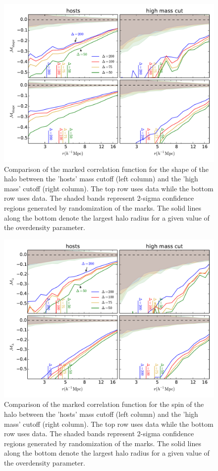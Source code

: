 \documentclass[usenatbib,usegraphicx,letterpaper]{mn2e}
\begin{document}
\begin{figure}
	\centering
	\includegraphics[width=\textwidth]{all_mcf_s_z00_hostsvhigh.pdf}
	\caption{Comparison of the marked correlation function for the shape of the halo between the 'hosts' mass cutoff (left column) and the 'high mass' cutoff (right column). The top row uses \simA data while the bottom row uses \simB data. The shaded bands represent 2-sigma confidence regions generated by randomization of the marks. The solid lines along the bottom denote the largest halo radius for a given value of the overdensity parameter.}
	\label{fig:hvh_mcf_s}
\end{figure}

\begin{figure}
	\centering
	\includegraphics[width=\textwidth]{all_mcf_spin_z00_hostsvhigh.pdf}
	\caption{Comparison of the marked correlation function for the spin of the halo between the 'hosts' mass cutoff (left column) and the 'high mass' cutoff (right column). The top row uses \simA data while the bottom row uses \simB data. The shaded bands represent 2-sigma confidence regions generated by randomization of the marks. The solid lines along the bottom denote the largest halo radius for a given value of the overdensity parameter.}
	\label{fig:hvh_mcf_spin}
\end{figure}
\end{document}
